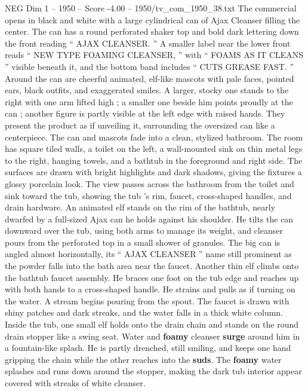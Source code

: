 \begin{textsample}{NEG Dim 1 – 1950 – Score -4.00 – 1950/tv\_com\_1950\_38.txt}  \label{ex:f1_neg_006}
The commercial opens in black and white with a large cylindrical can of Ajax Cleanser filling the center.
The can has a round perforated shaker top and bold dark lettering down the front reading “ AJAX CLEANSER. ” A smaller label near the lower front reads “ NEW TYPE FOAMING CLEANSER, ” with “ FOAMS AS IT CLEANS ” visible beneath it, and the bottom band includes “ CUTS GREASE FAST. ” Around the can are cheerful animated, elf-like mascots with pale faces, pointed ears, black outfits, and exaggerated smiles.
A larger, stocky one stands to the right with one arm lifted high ; a smaller one beside him points proudly at the can ; another figure is partly visible at the left edge with raised hands.
They present the product as if unveiling it, surrounding the oversized can like a centerpiece.
The can and mascots fade into a clean, stylized bathroom.
The room has square tiled walls, a toilet on the left, a wall-mounted sink on thin metal legs to the right, hanging towels, and a bathtub in the foreground and right side.
The surfaces are drawn with bright highlights and dark shadows, giving the fixtures a glossy porcelain look.
The view passes across the bathroom from the toilet and sink toward the tub, showing the tub ’s rim, faucet, cross-shaped handles, and drain hardware.
An animated elf stands on the rim of the bathtub, nearly dwarfed by a full-sized Ajax can he holds against his shoulder.
He tilts the can downward over the tub, using both arms to manage its weight, and cleanser pours from the perforated top in a small shower of granules.
The big can is angled almost horizontally, its “ AJAX CLEANSER ” name still prominent as the powder falls into the bath area near the faucet.
Another thin elf climbs onto the bathtub faucet assembly.
He braces one foot on the tub edge and reaches up with both hands to a cross-shaped handle.
He strains and pulls as if turning on the water.
A stream begins pouring from the spout.
The faucet is drawn with shiny patches and dark streaks, and the water falls in a thick white column.
Inside the tub, one small elf holds onto the drain chain and stands on the round drain stopper like a swing seat.
Water and \textbf{foamy} cleanser \textbf{surge} around him in a fountain-like splash.
He is partly drenched, still smiling, and keeps one hand gripping the chain while the other reaches into the \textbf{suds}.
The \textbf{foamy} water splashes and runs down around the stopper, making the dark tub interior appear covered with streaks of white cleanser.

\end{textsample}
